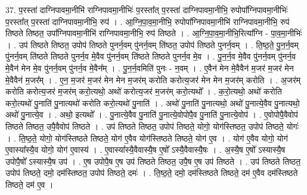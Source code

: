 \documentclass[17pt]{extarticle}
\begin{document}
37. प॒रस्ता॑ दाग्निपावमा॒नीभि॑ राग्निपावमा॒नीभिः॑ प॒रस्ता᳚त् प॒रस्ता॑ दाग्निपावमा॒नीभि॒ रुपोपा᳚ग्निपावमा॒नीभिः॑ प॒रस्ता᳚त् प॒रस्ता॑ दाग्निपावमा॒नीभि॒ रुप॑ । . आ॒ग्नि॒पा॒व॒मा॒नीभि॒ रुपोपा᳚ग्निपावमा॒नीभि॑ राग्निपावमा॒नीभि॒ रुप॑ तिष्ठते तिष्ठत॒ उपा᳚ग्निपावमा॒नीभि॑ राग्निपावमा॒नीभि॒ रुप॑ तिष्ठते । . आ॒ग्नि॒पा॒व॒मा॒नीभि॒रित्या᳚ग्नि - पा॒व॒मा॒नीभिः॑ । . उप॑ तिष्ठते तिष्ठत॒ उपोप॑ तिष्ठते पुनर्न॒वम् पु॑नर्न॒वम् ति॑ष्ठत॒ उपोप॑ तिष्ठते पुनर्न॒वम् । . ति॒ष्ठ॒ते॒ पु॒न॒र्न॒वम् पु॑नर्न॒वम् ति॑ष्ठते तिष्ठते पुनर्न॒व मे॒वैव पु॑नर्न॒वम् ति॑ष्ठते तिष्ठते पुनर्न॒व मे॒व । . पु॒न॒र्न॒व मे॒वैव पु॑नर्न॒वम् पु॑नर्न॒व मे॒वैन॑ मेन मे॒व पु॑नर्न॒वम् पु॑नर्न॒व मे॒वैन᳚म् । . पु॒न॒र्न॒वमिति॑ पुनः - न॒वम् । . ए॒वैन॑ मेन मे॒वैवैन॑ म॒जर॑ म॒जर॑ मेन मे॒वैवैन॑ म॒जर᳚म् । . ए॒न॒ म॒जर॑ म॒जर॑ मेन मेन म॒जर॑म् करोति करोत्य॒जर॑ मेन मेन म॒जर॑म् करोति । . अ॒जर॑म् करोति करोत्य॒जर॑ म॒जर॑म् करो॒त्यथो॒ अथो॑ करोत्य॒जर॑ म॒जर॑म् करो॒त्यथो᳚ । . क॒रो॒त्यथो॒ अथो॑ करोति करो॒त्यथो॑ पु॒नाति॑ पु॒नात्यथो॑ करोति करो॒त्यथो॑ पु॒नाति॑ । . अथो॑ पु॒नाति॑ पु॒नात्यथो॒ अथो॑ पु॒नात्ये॒वैव पु॒नात्यथो॒ अथो॑ पु॒नात्ये॒व । . अथो॒ इत्यथो᳚ । . पु॒नात्ये॒वैव पु॒नाति॑ पु॒नात्ये॒वोपोपै॒व पु॒नाति॑ पु॒नात्ये॒वोप॑ । . ए॒वोपोपै॒वैवोप॑ तिष्ठते तिष्ठत॒ उपै॒वैवोप॑ तिष्ठते । . उप॑ तिष्ठते तिष्ठत॒ उपोप॑ तिष्ठते॒ योगो॒ योग॑स्तिष्ठत॒ उपोप॑ तिष्ठते॒ योगः॑ । . ति॒ष्ठ॒ते॒ योगो॒ योग॑स्तिष्ठते तिष्ठते॒ योग॑ ए॒वैव योग॑स्तिष्ठते तिष्ठते॒ योग॑ ए॒व । . योग॑ ए॒वैव योगो॒ योग॑ ए॒वास्या᳚स्यै॒व योगो॒ योग॑ ए॒वास्य॑ । . ए॒वास्या᳚स्यै॒वैवास्यै॒ष ए॒षो᳚ ऽस्यै॒वैवास्यै॒षः । . अ॒स्यै॒ष ए॒षो᳚ ऽस्यास्यै॒ष उपोपै॒षो᳚ ऽस्यास्यै॒ष उप॑ । . ए॒ष उपोपै॒ष ए॒ष उप॑ तिष्ठते तिष्ठत॒ उपै॒ष ए॒ष उप॑ तिष्ठते । . उप॑ तिष्ठते तिष्ठत॒ उपोप॑ तिष्ठते॒ दमो॒ दम॑स्तिष्ठत॒ उपोप॑ तिष्ठते॒ दमः॑ । . ति॒ष्ठ॒ते॒ दमो॒ दम॑स्तिष्ठते तिष्ठते॒ दम॑ ए॒वैव दम॑स्तिष्ठते तिष्ठते॒ दम॑ ए॒व । \newline
\pagebreak
{}
\end{document}
